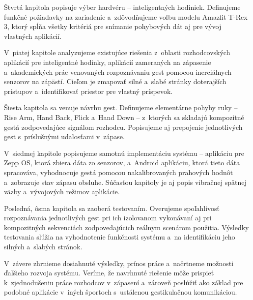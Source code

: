 Štvrtá kapitola popisuje výber hardvéru -- inteligentných
hodiniek. Definujeme funkčné požiadavky na zariadenie
a~zdôvodňujeme voľbu modelu Amazfit T-Rex 3, ktorý spĺňa
všetky kritériá pre snímanie pohybových dát aj pre vývoj
vlastných aplikácií.

V~piatej kapitole analyzujeme existujúce riešenia z~oblasti
rozhodcovských aplikácií pre inteligentné hodinky, aplikácií
zameraných na zápasenie a~akademických prác venovaných
rozpoznávaniu gest pomocou inerciálnych senzorov na zápästí.
Cieľom je zmapovať silné a~slabé stránky doterajších prístupov
a~identifikovať priestor pre vlastný príspevok.

Šiesta kapitola sa venuje návrhu gest. Definujeme elementárne
pohyby ruky -- Rise Arm, Hand Back, Flick a~Hand Down -- z~ktorých
sa skladajú kompozitné gestá zodpovedajúce signálom rozhodcu.
Popisujeme aj prepojenie jednotlivých gest s~príslušnými
udalosťami v~zápase.

V~siedmej kapitole popisujeme samotnú implementáciu systému --
aplikáciu pre Zepp OS, ktorá zbiera dáta zo senzorov, a~Android
aplikáciu, ktorá tieto dáta spracováva, vyhodnocuje gestá
pomocou nakalibrovaných prahových hodnôt a~zobrazuje stav
zápasu obsluhe. Súčasťou kapitoly je aj popis vibračnej
spätnej väzby a~vývojových režimov aplikácie.

Posledná, ôsma kapitola sa zaoberá testovaním. Overujeme
spoľahlivosť rozpoznávania jednotlivých gest pri ich
izolovanom vykonávaní aj pri kompozitných sekvenciách
zodpovedajúcich reálnym scenárom použitia. Výsledky
testovania slúžia na vyhodnotenie funkčnosti systému a~na
identifikáciu jeho silných a~slabých stránok.

V~závere zhrnieme dosiahnuté výsledky, prínos práce
a~načrtneme možnosti ďalšieho rozvoja systému. Veríme, že
navrhnuté riešenie môže prispieť k~zjednodušeniu práce
rozhodcov v~zápasení a~zároveň poslúžiť ako základ pre
podobné aplikácie v~iných športoch s~ustálenou gestikulačnou
komunikáciou.